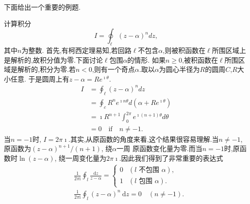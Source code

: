 下面给出一个重要的例题.
\begin{examplebox}{计算积分\[ I = \oint_\ell (z-\alpha)^n dz, \]其中$n$为整数.}
首先,有柯西定理易知,若回路$\ell$不包含$\alpha$,则被积函数在$\ell$所围区域上是解析的,故积分值为零.下面讨论$\ell$包围$\alpha$的情形.
如果$n\geq 0$,被积函数在$\ell$所围区域是解析的,积分为零.若$n<0$,则有一个奇点$\alpha$.取以$\alpha$为圆心半径为$R$的圆周$C$,$R$大小任意.
于是圆周上有$z-\alpha = Re^{\imath \theta}$.
\begin{equation}
\begin{aligned}
    I &= \oint_\ell (z-\alpha)^n dz\\
     &= \oint_c R^n e^{\imath n \theta} d (\alpha + R e^{\imath \theta})\\
     & =  \imath R^{n+1} \int_0^{2\pi} e^{\imath (n+1)\theta}  d\theta \\
     & = 0 \quad \textrm{if} \quad n\neq -1.
\end{aligned}
\end{equation}
当$n = -1$时, $I = 2\pi \imath$.其实,从原函数的角度来看,这个结果很容易理解.当$n\neq -1$,原函数为$(z-\alpha)^{n+1}/(n+1)$, 绕$\alpha$一周
原函数变化量为零.而当$n=-1$时,原函数时$\ln(z-\alpha)$, 绕一周变化量为$2\pi \imath$.因此我们得到了非常重要的表达式
\begin{equation}
    \begin{aligned}
        & \frac{1}{2 \pi \mathrm{i}} \oint_l \frac{\mathrm{d} z}{z-\alpha}= \begin{cases}0 & (l \text { 不包围 } \alpha), \\
        1 & (l \text { 包围 } \alpha) . \end{cases} \\
        & \frac{1}{2 \pi \mathrm{i}} \oint_l(z-\alpha)^n \mathrm{~d} z=0 \quad(n \neq-1) .
        \end{aligned}
\end{equation}
\end{examplebox}